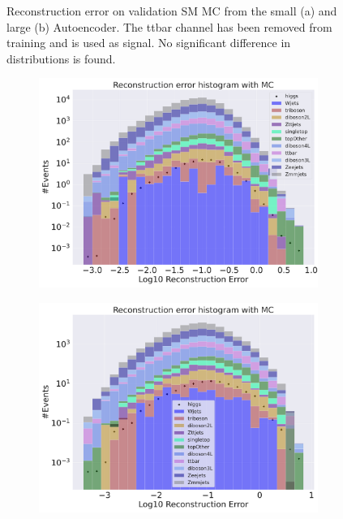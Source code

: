 \begin{figure}[H]
\begin{subfigure}{.45\textwidth}
        \caption{ }
        \label{fig:ae_big_ttbar}
    \end{subfigure}
    \hfill 
    \caption[AE | Reconstruction error using ttbar channel as signal]{Reconstruction error on validation SM MC from the small (a) and large (b) Autoencoder. The ttbar channel has been removed from training and 
    is used as signal. No significant difference in distributions is found.  }
    \label{fig:ae_big_channel_3}
\end{figure}



\begin{figure}[H]
    \centering
    \begin{subfigure}{.45\textwidth}
        \includegraphics[width=\textwidth]{Figures/VAE_testing/small/b_data_recon_big_rm3_feats_sig_higgs.pdf}
        \caption{}
        \label{fig:vae_small_higgs}
    \end{subfigure}
    \hfill 
    \begin{subfigure}{.45\textwidth}
        \includegraphics[width=\textwidth]{Figures/VAE_testing/big/b_data_recon_big_rm3_feats_sig_higgs.pdf}

\end{subfigure}
\end{figure}
